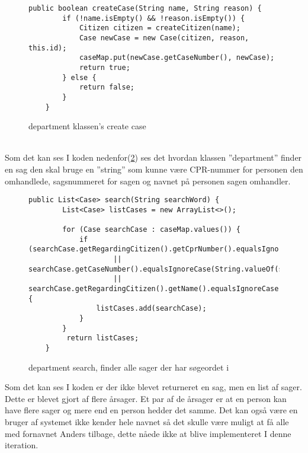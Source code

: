 \begin{figure}[h]
\begin{lstlisting}
public boolean createCase(String name, String reason) {
        if (!name.isEmpty() && !reason.isEmpty()) {
            Citizen citizen = createCitizen(name);
            Case newCase = new Case(citizen, reason, this.id);
            caseMap.put(newCase.getCaseNumber(), newCase);
            return true;
        } else {
            return false;
        }
    }
\end{lstlisting}
\caption{department klassen's create case}
\label{kode:createcase}
\end{figure}\\
Som det kan ses I koden nedenfor(\ref{kode:search}) ses det hvordan klassen ”department” finder en sag den skal bruge en ”string” som kunne være CPR-nummer for personen den omhandlede, sagsnummeret for sagen og navnet på personen sagen omhandler. 
\begin{figure}
\begin{lstlisting}
public List<Case> search(String searchWord) {
        List<Case> listCases = new ArrayList<>();

        for (Case searchCase : caseMap.values()) {
            if (searchCase.getRegardingCitizen().getCprNumber().equalsIgnoreCase(searchWord)
                    || searchCase.getCaseNumber().equalsIgnoreCase(String.valueOf(searchWord))
                    || searchCase.getRegardingCitizen().getName().equalsIgnoreCase(searchWord)) {
                listCases.add(searchCase);
            }
        }
         return listCases;
    }
\end{lstlisting}
\caption{department search, finder alle sager der har søgeordet i}
\label{kode:search}
\end{figure}
Som det kan ses I koden er der ikke blevet returneret en sag, men en list af sager. Dette er blevet gjort af flere årsager. Et par af de årsager er at en person kan have flere sager og mere end en person hedder det samme. Det kan også være en bruger af systemet ikke kender hele navnet så det skulle være muligt at få alle med fornavnet Anders tilbage, dette nåede ikke at blive implementeret I denne iteration. 

